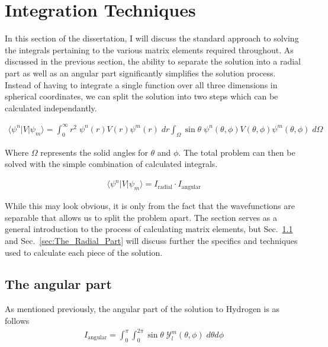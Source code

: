     \section{Integration Techniques} \label{sec:Integration_Techniques}
        In this section of the dissertation, I will discuss the standard approach to solving the integrals pertaining to the various matrix elements required throughout. As discussed in the previous section, the ability to separate the solution into a radial part as well as an angular part significantly simplifies the solution process. Instead of having to integrate a single function over all three dimensions in spherical coordinates, we can split the solution into two steps which can be calculated independantly.

        \begin{align}
            \langle \psi^n \vert V \vert \psi_m \rangle = \int_{0}^{\infty} r^2 \; \psi^n(r) V(r) \psi^m(r) \; dr \int_\Omega \sin \theta \; \psi^n(\theta, \phi) V(\theta, \phi) \psi^m(\theta, \phi) \; d\Omega
        \end{align}

        Where $\Omega$ represents the solid angles for $\theta$ and $\phi$. The total problem can then be solved with the simple combination of calculated integrals.

        \begin{align}
             \langle \psi^n \vert V \vert \psi_m \rangle = I_{\text{radial}} \cdot I_{\text{angular}}
        \end{align}

        While this may look obvious, it is only from the fact that the wavefunctions are separable that allows us to split the problem apart. The section serves as a general introduction to the process of calculating matrix elements, but Sec.~\ref{sec:The_Angular_Part} and Sec.~\ref{sec:The_Radial_Part} will discuss further the specifics and techniques used to calculate each piece of the solution.

        \subsection{The angular part} \label{sec:The_Angular_Part}
        As mentioned previously, the angular part of the solution to Hydrogen is as follows
        \begin{align}
            I_{\text{angular}} = \int_0^\pi \int_0^{2\pi}\sin \theta \;\mathcal{Y}^m_l (\theta, \phi) \; d\theta d\phi 
        \end{align}

